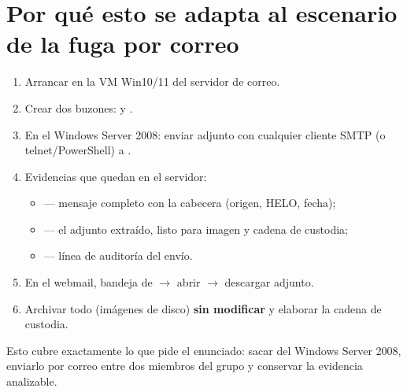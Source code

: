 \section{Por qué esto se adapta al escenario de la fuga por correo}

\begin{enumerate}
  \item Arrancar  en la VM Win10/11 del servidor de correo.
  \item Crear dos buzones:  y
        .
  \item En el Windows Server 2008: enviar  adjunto con
        cualquier cliente SMTP (o telnet/PowerShell) a
        .
  \item Evidencias que quedan en el servidor:
        \begin{itemize}
          \item {} --- mensaje
                completo con la cabecera  (origen, HELO,
                fecha);
          \item {} ---
                el adjunto extraído, listo para imagen y cadena de custodia;
          \item {} --- línea de auditoría del
                envío.
        \end{itemize}
  \item En el webmail, bandeja de  $\rightarrow$ abrir $\rightarrow$
        descargar adjunto.
  \item Archivar todo (imágenes de disco) \textbf{sin modificar} y elaborar la
        cadena de custodia.
\end{enumerate}

Esto cubre exactamente lo que pide el enunciado: sacar 
del Windows Server 2008, enviarlo por correo entre dos miembros del grupo y
conservar la evidencia analizable.



